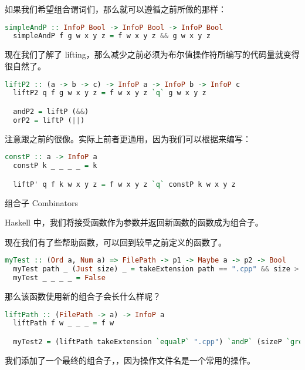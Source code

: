 \documentclass[./main.tex]{subfiles}
\begin{document}
如果我们希望组合谓词们，那么就可以遵循之前所做的那样：

\begin{lstlisting}[language=Haskell]
  simpleAndP :: InfoP Bool -> InfoP Bool -> InfoP Bool
  simpleAndP f g w x y z = f w x y z && g w x y z
\end{lstlisting}

现在我们了解了 lifting，那么减少之前必须为布尔值操作符所编写的代码量就变得很自然了。

\begin{lstlisting}[language=Haskell]
  liftP2 :: (a -> b -> c) -> InfoP a -> InfoP b -> InfoP c
  liftP2 q f g w x y z = f w x y z `q` g w x y z

  andP2 = liftP (&&)
  orP2 = liftP (||)
\end{lstlisting}

注意跟之前的很像。实际上前者更通用，因为我们可以根据来编写：

\begin{lstlisting}[language=Haskell]
  constP :: a -> InfoP a
  constP k _ _ _ _ = k

  liftP' q f k w x y z = f w x y z `q` constP k w x y z
\end{lstlisting}

\begin{anote}
  组合子 Combinators

  Haskell 中，我们将接受函数作为参数并返回新函数的函数成为组合子。
\end{anote}

现在我们有了些帮助函数，可以回到较早之前定义的函数了。

\begin{lstlisting}[language=Haskell]
  myTest :: (Ord a, Num a) => FilePath -> p1 -> Maybe a -> p2 -> Bool
  myTest path _ (Just size) _ = takeExtension path == ".cpp" && size > 131072
  myTest _ _ _ _ = False
\end{lstlisting}

那么该函数使用新的组合子会长什么样呢？

\begin{lstlisting}[language=Haskell]
  liftPath :: (FilePath -> a) -> InfoP a
  liftPath f w _ _ _ = f w

  myTest2 = (liftPath takeExtension `equalP` ".cpp") `andP` (sizeP `greaterP` 131072)
\end{lstlisting}

我们添加了一个最终的组合子，，因为操作文件名是一个常用的操作。
\end{document}

